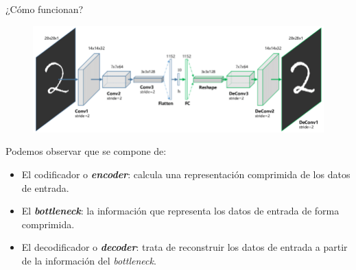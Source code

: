\begin{frame}{¿Cómo funcionan?}

\begin{figure}
    \centering
    \includegraphics[width=.7\textwidth]{Slides/figures/02_Metodos_Generativos/cnn-ae-adv.png}
\end{figure}

Podemos observar que se compone de:
\begin{itemize}
    \item El codificador o \textit{\textbf{encoder}}: calcula una representación comprimida de los datos de entrada.
    \item El \textbf{\textit{bottleneck}}: la información que representa los datos de entrada de forma comprimida.
    \item El decodificador o \textit{\textbf{decoder}}: trata de reconstruir los datos de entrada a partir de la información del \textit{bottleneck}.
\end{itemize}
\end{frame}


